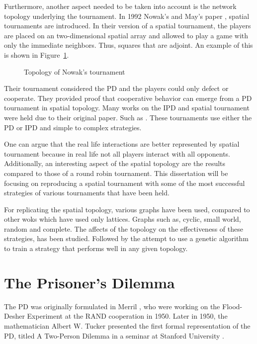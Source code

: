 Furthermore, another aspect needed to be taken into account is the network
topology underlying the tournament. In 1992 Nowak's and May's paper \cite{Nowak1992},
spatial tournaments are introduced. In their version of a spatial tournament,
the players are placed on an two-dimensional spatial array and allowed to play a
game with only the immediate neighbors. Thus, squares that are adjoint.
An example of this is shown in Figure~\ref{fig:nowak-example}.

\begin{figure}[!hbtp]
	\centering
		
		\caption{Topology of Nowak's tournament}
  \label{fig:nowak-example}
\end{figure}

Their tournament considered the PD and the players could only defect or
cooperate.  They provided proof that cooperative behavior can emerge from a PD
tournament in spatial topology. Many works on the IPD and spatial tournament
were held due to their original paper. Such as \cite{Grujic2014, Nowak1993,
Maciver1992, Nowak1992, Brauchli1999, Meng2015, Lindgren1994}.
These tournaments use either the PD or IPD and simple to complex strategies.

One can argue that the real life interactions are better represented by spatial
tournament because in real life not all players interact with all opponents.
Additionally, an interesting aspect of the spatial topology are the results
compared to those of a round robin tournament. This dissertation will be focusing on
reproducing a spatial tournament with some of the most successful strategies of
various tournaments that have been held.

For replicating the spatial topology, various graphs have been used, compared to
other woks which have used only lattices. Graphs such as, cyclic,
small world, random and complete. The affects of the topology on the
effectiveness of these strategies, has been studied. Followed by the attempt to
use a genetic algorithm to train a strategy that performs well in any given
topology.

\section{The Prisoner's Dilemma}
The PD was originally formulated in Merril \cite{Flood1958},
who were working on the Flood-Desher Experiment at the RAND cooperation in 1950.
Later in 1950, the mathematician Albert W. Tucker presented the first formal
representation of the PD, titled  A Two-Person Dilemma in a seminar at
Stanford University \cite{GassAssad2005}.

